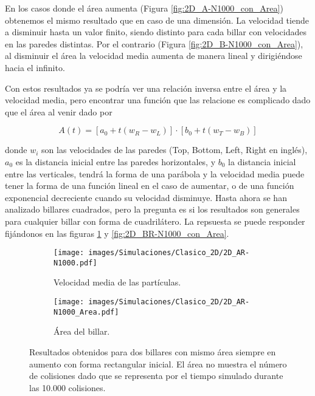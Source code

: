 En los casos donde el área aumenta (Figura \ref{fig:2D_A-N1000_con_Area}) obtenemos el mismo resultado que en caso de una dimensión. La velocidad tiende a disminuir hasta un valor finito, siendo distinto para cada billar con velocidades en las paredes distintas. Por el contrario (Figura \ref{fig:2D_B-N1000_con_Area}), al disminuir el área la velocidad media aumenta de manera lineal y dirigiéndose hacia el infinito. 

\vspace{3mm}

Con estos resultados ya se podría ver una relación inversa entre el área y la velocidad media, pero encontrar una función que las relacione es complicado dado que el área al venir dado por 

\begin{equation}\label{eq:area}
    A(t) = \left[ a_0 + t (w_R - w_L) \right] \cdot \left[ b_0 + t (w_T - w_B) \right]
\end{equation}

donde \( w_i \) son las velocidades de las paredes (Top, Bottom, Left, Right en inglés), \( a_0 \) es la distancia inicial entre las paredes horizontales, y \( b_0 \) la distancia inicial entre las verticales, tendrá la forma de una parábola y la velocidad media puede tener la forma de una función lineal en el caso de aumentar, o de una función exponencial decreciente cuando su velocidad disminuye. Hasta ahora se han analizado billares cuadrados, pero la pregunta es si los resultados son generales para cualquier billar con forma de cuadrilátero. La repsuesta se puede responder fijándonos en las figuras \ref{fig:2D_AR-N1000_con_Area} y \ref{fig:2D_BR-N1000_con_Area}. 

\begin{figure}[H]
    \begin{subfigure}[b]{0.5\textwidth}
        \centering
        \texttt{[image: images/Simulaciones/Clasico\_2D/2D\_AR-N1000.pdf]}
        \caption{Velocidad media de las partículas.}
    \end{subfigure}
    \hfill
    \begin{subfigure}[b]{0.5\textwidth}
        \centering
        \texttt{[image: images/Simulaciones/Clasico\_2D/2D\_AR-N1000\_Area.pdf]}
        \caption{Área del billar.}
    \end{subfigure}
    \caption{Resultados obtenidos para dos billares con mismo área siempre en aumento con forma rectangular inicial. El área no muestra el número de colisiones dado que se representa por el tiempo simulado durante las 10.000 colisiones.}
    \label{fig:2D_AR-N1000_con_Area}
\end{figure}

